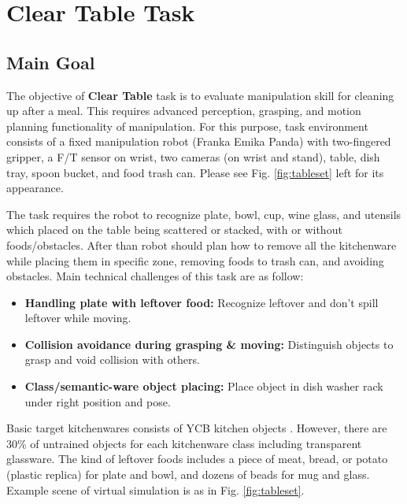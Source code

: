 \section{Clear Table Task}
\label{sec:clear_task}


\subsection{Main Goal}

The objective of \textbf{Clear Table} task is to evaluate manipulation skill for cleaning up after a meal.
This requires advanced perception, grasping, and motion planning functionality of manipulation.
For this purpose, task environment consists of a fixed manipulation robot (Franka Emika Panda) with two-fingered gripper,
a F/T sensor on wrist, two cameras (on wrist and stand), table, dish tray, spoon bucket, and food trash can. Please see Fig. \ref{fig:tableset} left for its appearance.

The task requires the robot to recognize plate, bowl, cup, wine glass, and utensils which placed on the table being scattered or stacked, with or without foods/obstacles.
After than robot should plan how to remove all the kitchenware while placing them in specific zone, removing foods to trash can, and avoiding obstacles.
Main technical challenges of this task are as follow:
\begin{itemize}
\item
\textbf{Handling plate with leftover food:} 
Recognize leftover and don't spill leftover while moving.
\item
\textbf{Collision avoidance during grasping \& moving:}
Distinguish objects to grasp and void collision with others.
\item
\textbf{Class/semantic-ware object placing:}
Place object in dish washer rack under right position and pose.
\end{itemize}

Basic target kitchenwares consists of YCB kitchen objects \cite{ycb}.
However, there are 30\% of untrained objects for each kitchenware class including transparent glassware.
The kind of leftover foods includes a piece of meat, bread, or potato (plastic replica) for plate and bowl, and dozens of beads for mug and glass. 
Example scene of virtual simulation is as in Fig. \ref{fig:tableset}.

